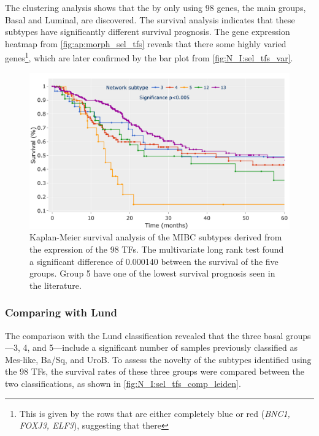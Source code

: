 The clustering analysis shows that the by only using 98 genes, the main groups, Basal and Luminal, are discovered. The survival analysis indicates that these subtypes have significantly different survival prognosis. The gene expression heatmap from \cref{fig:ap:morph_sel_tfs} reveals that there some highly varied genes\footnote{This is given by the rows that are either completely blue or red (\textit{BNC1, FOXJ3, ELF3}), suggesting that there }, which are later confirmed by the bar plot from \cref{fig:N_I:sel_tfs_var}. 


\begin{figure}[!t]
    \centering
    \includegraphics[width=1.0\textwidth,keepaspectratio]{Sections/Network_I/Resources/selective_pruning/sel_tfs/survival_sel_tfs_cs.png}
    \caption{Kaplan-Meier survival analysis of the MIBC subtypes derived from the expression of the 98 TFs. The multivariate long rank test found a significant difference of 0.000140 between the survival of the five groups. Group 5 have one of the lowest survival prognosis seen in the literature. }
    \label{fig:N_I:sel_tfs_survival}
\end{figure} 


\subsubsection*{Comparing with Lund} \label{s:N_I:sel_tfs_comp_survival}

The comparison with the Lund classification \citep{Marzouka2018-ge} revealed that the three basal groups—3, 4, and 5—include a significant number of samples previously classified as Mes-like, Ba/Sq, and UroB. To assess the novelty of the subtypes identified using the 98 TFs, the survival rates of these three groups were compared between the two classifications, as shown in \cref{fig:N_I:sel_tfs_comp_leiden}.


